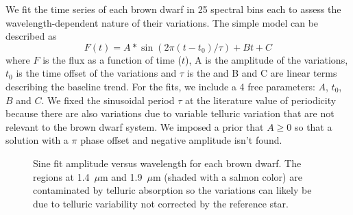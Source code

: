 \documentclass[twocolumn]{aastex6}
\begin{document}
We fit the time series of each brown dwarf in 25 spectral bins each to assess the wavelength-dependent nature of their variations.
The simple model can be described as 
\begin{equation}
F(t) = A * \sin(2 \pi (t - t_0)/\tau) + B t + C
\end{equation}
where $F$ is the flux as a function of time ($t$), A is the amplitude of the variations, $t_0$ is the time offset of the variations and $\tau$ is the and B and C are linear terms describing the baseline trend.
For the fits, we include a 4 free parameters: $A$, $t_0$, $B$ and $C$.
We fixed the sinusoidal period $\tau$ at the literature value of periodicity because there are also variations due to variable telluric variation that are not relevant to the brown dwarf system.
We imposed a prior that $A \geq 0$ so that a solution with a $\pi$ phase offset and negative amplitude isn't found.

\begin{figure}[!]
\centering
{}
	\caption{Sine fit amplitude versus wavelength for each brown dwarf. The regions at 1.4~$\mu$m and 1.9~$\mu$m (shaded with a salmon color) are contaminated by telluric absorption so the variations can likely be due to telluric variability not corrected by the reference star.}
	\label{fig:ampSpec}
\end{figure} 
\end{document}
